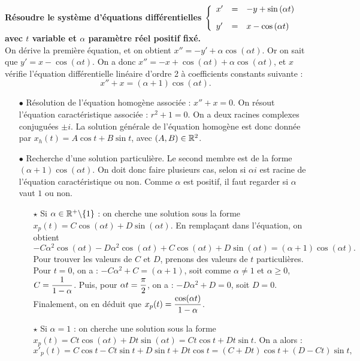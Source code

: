 \documentclass[a4paper, 11pt,reqno]{article}
\begin{document}
\begin{correction}  \;
\textbf{R\'esoudre le syst\`eme d'\'equations diff\'erentielles 
$\mathbf{\left\lbrace\begin{array}{lll} 
x^{\prime}&=& -y+\sin{(\alpha t)}\vsec\\
y^{\prime}&=& x-\cos{(\alpha t)}
\end{array}\right.}$ avec $t$ variable et $\alpha$ param\`etre r\'eel positif fix\'e.}\\
On d\'erive la premi\`ere \'equation, et on obtient $x''=-y'+\alpha \cos(\alpha t)$. Or on sait que $y'=x-\cos(\alpha t)$. On a donc $x''=-x+\cos(\alpha t) + \alpha \cos(\alpha t)$, et $x$ v\'erifie l'\'equation diff\'erentielle lin\'eaire d'ordre 2 \`a coefficients constants suivante :
$$x''+x=(\alpha + 1) \cos(\alpha t).$$
\begin{itemize}
\item[$\bullet$] R\'esolution de l'\'equation homog\`ene associ\'ee : $x''+x=0$. On r\'esout l'\'equation caract\'eristique associ\'ee : $r^2+1=0$. On a deux racines complexes conjugu\'ees $\pm i$. La solution g\'en\'erale de l'\'equation homog\`ene est donc donn\'ee par $x_h(t) = A\cos t + B \sin t$, avec $(A,B) \in \mathbb{R}^2$.
\item[$\bullet$] Recherche d'une solution particuli\`ere. Le second membre est de la forme $(\alpha + 1) \cos(\alpha t)$. On doit donc faire plusieurs cas, selon si $\alpha i$ est racine de l'\'equation caract\'eristique ou non. Comme $\alpha$ est positif, il faut regarder si $\alpha$ vaut $1$ ou non.
\begin{itemize}
\item[$\star$] Si $\alpha \in \mathbb{R}^+\backslash\{1\}$ : on cherche une solution sous la forme $x_p(t) = C \cos (\alpha t) + D \sin (\alpha t)$. En rempla\c cant dans l'\'equation, on obtient 
$$-C \alpha^2 \cos(\alpha t) - D \alpha^2 \cos(\alpha t) + C \cos (\alpha t) + D \sin (\alpha t) = (\alpha +1) \cos(\alpha t).$$
Pour trouver les valeurs de $C$ et $D$, prenons des valeurs de $t$ particuli\`eres. Pour $t=0$, on a : $-C \alpha^2+C = (\alpha +1)$, soit comme $\alpha\not=1$ et $\alpha \geq 0$, $C=\displaystyle \frac{1}{1-\alpha}$. Puis, pour $\alpha t=\displaystyle \frac{\pi}{2}$, on a : $-D \alpha ^2 + D = 0$, soit $D=0$. Finalement, on en d\'eduit que $x_p(t) = \displaystyle  \frac{ \cos (\alpha t)}{1-\alpha}$.
\item[$\star$] Si $\alpha=1$ : on cherche une solution sous la forme $x_p(t) = C t \cos (\alpha t) + D t \sin (\alpha t)= Ct \cos t + D t \sin t$. On a alors :
$$x'_p(t) = C \cos t - C t \sin t + D \sin t +D t \cos t = (C+Dt) \cos t + (D-C t) \sin t,$$ 

\end{itemize}
\end{itemize}
\end{correction}
\end{document}
